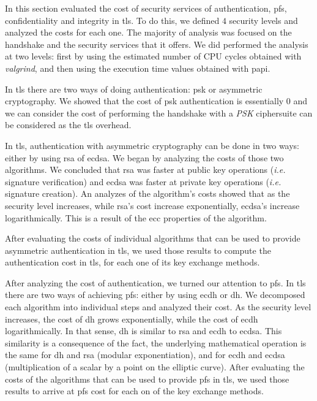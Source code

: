 In this section evaluated the cost of security services of authentication, \gls{pfs}, confidentiality and integrity
in \gls{tls}. To do this, we defined $4$ security levels and analyzed the costs for each one. The majority of
analysis was focused on the handshake and the security services that it offers. We did performed the analysis at
two levels: first by using the estimated number of CPU cycles obtained with \textit{valgrind}, and then using the
execution time values obtained with \gls{papi}.

In \gls{tls} there are two ways of doing authentication: \gls{psk} or asymmetric cryptography. We showed that the
cost of \gls{psk} authentication is essentially $0$ and we can consider the cost of performing the 
handshake with a \textit{PSK} ciphersuite can be considered as the \gls{tls} overhead.

In \gls{tls}, authentication with asymmetric cryptography can be done in two ways: either by using \gls{rsa}
of \gls{ecdsa}. We began by analyzing the costs of those two algorithms. We concluded that \gls{rsa} was
faster at public key operations (\textit{i.e.} signature verification) and \gls{ecdsa} was faster at private key
operations (\textit{i.e.} signature creation). An analyzes of the algorithm's costs showed that as the security level
increases, while \gls{rsa}'s cost increase exponentially, \gls{ecdsa}'s increase logarithmically. This is a result of the
\gls{ecc} properties of the algorithm.

After evaluating the costs of individual algorithms that can be used to provide asymmetric authentication in \gls{tls}, we
used those results to compute the authentication cost in \gls{tls}, for each one of its key exchange methods.

After analyzing the cost of authentication, we turned our attention to \gls{pfs}. In \gls{tls} there are two ways
of achieving \gls{pfs}: either by using \gls{ecdh} or \gls{dh}. We decomposed each algorithm into individual steps
and analyzed their cost. As the security level increases, the cost of \gls{dh} grows exponentially, while the cost
of \gls{ecdh} logarithmically. In that sense, \gls{dh} is similar to \gls{rsa} and \gls{ecdh} to \gls{ecdsa}.
This similarity is a consequence of the fact, the underlying mathematical operation is the same for \gls{dh} and
\gls{rsa} (modular exponentiation), and for \gls{ecdh} and \gls{ecdsa} (multiplication of a scalar by a point on 
the elliptic curve). After evaluating the costs of the algorithms that can be used to provide \gls{pfs} in \gls{tls}, we used those results
to arrive at \gls{pfs} cost for each on of the key exchange methods.

